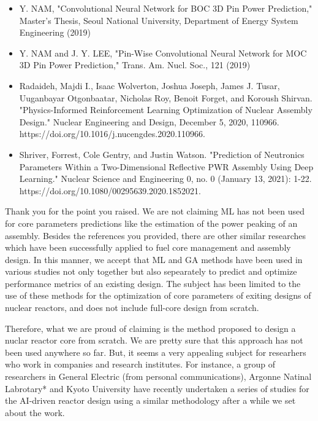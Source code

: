 \documentclass{ar2rc}
\begin{document}
\begin{itemize}
    \item Y. NAM, "Convolutional Neural Network for BOC 3D Pin Power
    Prediction," Master's Thesis, Seoul National University, Department of
    Energy System Engineering (2019)

    \item Y. NAM and J. Y. LEE, "Pin-Wise Convolutional Neural Network for MOC
    3D Pin Power Prediction," Trans. Am. Nucl. Soc., 121 (2019)

    \item Radaideh, Majdi I., Isaac Wolverton, Joshua Joseph, James J. Tusar,
    Uuganbayar Otgonbaatar, Nicholas Roy, Benoit Forget, and Koroush Shirvan.
    "Physics-Informed Reinforcement Learning Optimization of Nuclear Assembly
    Design." Nuclear Engineering and Design, December 5, 2020, 110966.
    https://doi.org/10.1016/j.nucengdes.2020.110966.

    \item Shriver, Forrest, Cole Gentry, and Justin Watson. "Prediction of
    Neutronics Parameters Within a Two-Dimensional Reflective PWR Assembly Using
    Deep Learning." Nuclear Science and Engineering 0, no. 0 (January 13, 2021):
    1-22. https://doi.org/10.1080/00295639.2020.1852021. \end{itemize}


    \Response Thank you for the point you raised. We are not claiming ML has    not been used for core parameters predictions like the estimation of the    power peaking of an assembly. Besides the references you provided, there    are other similar researches which have been successfully applied to    fuel core management and assembly design. In this manner, we accept that    ML and GA methods have been used in various studies not only together    but also sepearately to predict and optimize performance metrics of an    existing design. The subject has been limited to the use of these    methods for the optimization of core parameters of exiting designs of    nuclear reactors, and does not include full-core design from scratch.

    Therefore, what we are proud of claiming is the method proposed to design a nuclar reactor core from scratch. We are pretty sure that this approach has not been used anywhere so far. But, it seems a very appealing subject for researhers who work in companies and research institutes. For instance, a group of researchers in General Electric (from personal communications), Argonne Natinal Labrotary* and Kyoto University \cite{Kim2020} have recently undertaken a series of studies for the AI-driven reactor design using a similar methodology after a while we set about the work.
\end{document}

